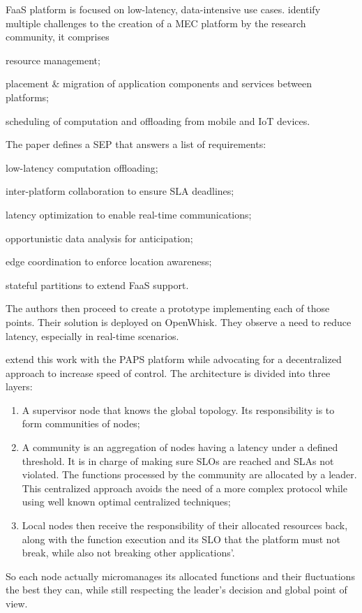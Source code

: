 \begin{description}[leftmargin=10pt]
	\item[\citeposs{baresi_paps_2019}] \gls{FaaS} platform is focused on low-latency, data-intensive use cases. \cite{baresi_towards_2019} identify multiple challenges to the creation of a \gls{MEC} platform by the research community, it comprises
		\begin{enumerate*}[(i)]
			\item resource management;
			\item placement \& migration of application components and services between platforms;
			\item scheduling of computation and offloading from mobile and \gls{IoT} devices.
		\end{enumerate*}
		The paper defines a \gls{SEP} that answers a list of requirements:
		\begin{enumerate*}[(a)]
			\item low-latency computation offloading;
			\item inter-platform collaboration to ensure \gls{SLA} deadlines;
			\item latency optimization to enable real-time communications;
			\item opportunistic data analysis for anticipation;
			\item edge coordination to enforce location awareness;
			\item stateful partitions to extend \gls{FaaS} support.
		\end{enumerate*}
		The authors then proceed to create a prototype implementing each of those points. Their solution is deployed on OpenWhisk. They observe a need to reduce latency, especially in real-time scenarios.

		\citet{baresi_paps_2019, baresi_paps_2021} extend this work with the \gls{PAPS} platform while advocating for a decentralized approach to increase speed of control.
		The architecture is divided into three layers:
		\begin{enumerate}[(1)]
			\item A supervisor node that knows the global topology. Its responsibility is to form communities of nodes;
			\item A community is an aggregation of nodes having a latency under a defined threshold. It is in charge of making sure \glspl{SLO} are reached and \glspl{SLA} not violated. The functions processed by the community are allocated by a leader. This centralized approach avoids the need of a more complex protocol while using well known optimal centralized techniques;
			\item Local nodes then receive the responsibility of their allocated resources back, along with the function execution and its \gls{SLO} that the platform must not break, while also not breaking other applications'.
		\end{enumerate}
		So each node actually micromanages its allocated functions and their fluctuations the best they can, while still respecting the leader's decision and global point of view.


\end{description}
